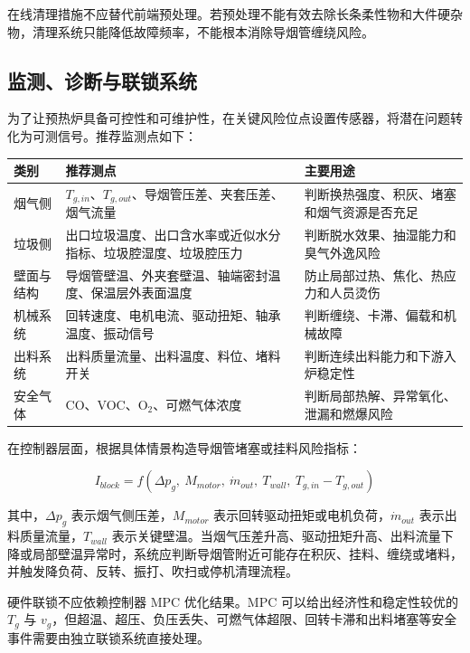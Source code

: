 \documentclass[UTF8,openany,zihao=-4,oneside]{ctexbook}
\begin{document}
在线清理措施不应替代前端预处理。若预处理不能有效去除长条柔性物和大件硬杂物，清理系统只能降低故障频率，不能根本消除导烟管缠绕风险。

\subsection{监测、诊断与联锁系统}\label{ux76d1ux6d4bux8bcaux65adux4e0eux8054ux9501ux7cfbux7edf}

为了让预热炉具备可控性和可维护性，在关键风险位点设置传感器，将潜在问题转化为可测信号。推荐监测点如下：

\begin{longtable}[c]{@{}p{}p{}p{}@{}}
\toprule\noalign{}
类别 & 推荐测点 & 主要用途 \\
\midrule\noalign{}
\endhead
\bottomrule\noalign{}
\endlastfoot
烟气侧 & \(T_{g,in}\)、\(T_{g,out}\)、导烟管压差、夹套压差、烟气流量 & 判断换热强度、积灰、堵塞和烟气资源是否充足 \\
垃圾侧 & 出口垃圾温度、出口含水率或近似水分指标、垃圾腔湿度、垃圾腔压力 & 判断脱水效果、抽湿能力和臭气外逸风险 \\
壁面与结构 & 导烟管壁温、外夹套壁温、轴端密封温度、保温层外表面温度 & 防止局部过热、焦化、热应力和人员烫伤 \\
机械系统 & 回转速度、电机电流、驱动扭矩、轴承温度、振动信号 & 判断缠绕、卡滞、偏载和机械故障 \\
出料系统 & 出料质量流量、出料温度、料位、堵料开关 & 判断连续出料能力和下游入炉稳定性 \\
安全气体 & CO、VOC、O\(_2\)、可燃气体浓度 & 判断局部热解、异常氧化、泄漏和燃爆风险 \\
\end{longtable}

在控制器层面，根据具体情景构造导烟管堵塞或挂料风险指标：

\[
I_{block}=f(\Delta p_g,\ M_{motor},\ \dot m_{out},\ T_{wall},\ T_{g,in}-T_{g,out})
\]

其中，\(\Delta p_g\) 表示烟气侧压差，\(M_{motor}\) 表示回转驱动扭矩或电机负荷，\(\dot m_{out}\) 表示出料质量流量，\(T_{wall}\) 表示关键壁温。当烟气压差升高、驱动扭矩升高、出料流量下降或局部壁温异常时，系统应判断导烟管附近可能存在积灰、挂料、缠绕或堵料，并触发降负荷、反转、振打、吹扫或停机清理流程。

硬件联锁不应依赖控制器 MPC 优化结果。MPC 可以给出经济性和稳定性较优的 \(T_g\) 与 \(v_g\)，但超温、超压、负压丢失、可燃气体超限、回转卡滞和出料堵塞等安全事件需要由独立联锁系统直接处理。
\end{document}
